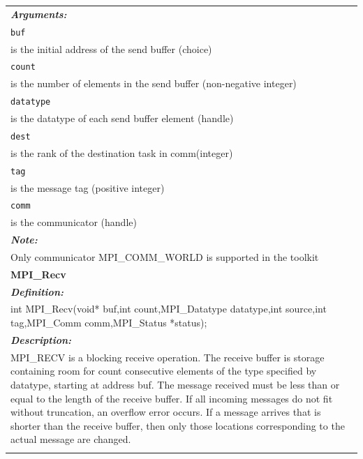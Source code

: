 \begin{longtable}{|p{5.5in}|}
\emph{\bfseries{Arguments: }} \\
\lstinline$buf$\\
\hspace{0.5cm}     is the initial address of the send buffer (choice)\\
\lstinline$count$\\
\hspace{0.5cm}     is the number of elements in the send buffer (non-negative integer)\\
\lstinline$datatype$\\
\hspace{0.5cm}     is the datatype of each send buffer element (handle)\\
\lstinline$dest$\\
\hspace{0.5cm}     is the rank of the destination task in comm(integer)\\
\lstinline$tag$\\
\hspace{0.5cm}     is the message tag (positive integer)\\
\lstinline$comm$\\
\hspace{0.5cm}     is the communicator (handle) \\
\vspace{-0.3cm}

\emph{\bfseries{Note: }} \\
Only communicator MPI\_COMM\_WORLD is supported in the toolkit\\

\hline

\vspace{-0.8cm}

\LARGE{\bfseries{MPI\_Recv}}\\

\vspace{-0.3cm}

\emph{\bfseries{Definition: }} \\
int MPI\_Recv(void* buf,int count,MPI\_Datatype datatype,int source,int tag,MPI\_Comm comm,MPI\_Status *status); \\
\vspace{-0.3cm}

\emph{\bfseries{Description: }} \\
MPI\_RECV is a blocking receive operation. The receive buffer is storage containing room for count consecutive elements of the type specified by datatype, starting at address buf. The message received must be less than or equal to the length of the receive buffer. If all incoming messages do not fit without truncation, an overflow error occurs. If a message arrives that is shorter than the receive buffer, then only those locations corresponding to the actual message are changed. \\
\vspace{-0.3cm}


\end{longtable}

